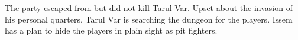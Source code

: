 The party escaped from but did not kill Tarul Var.
Upset about the invasion of his personal quarters, Tarul Var is searching the dungeon for the players.
Issem has a plan to hide the players in plain sight as pit fighters.
